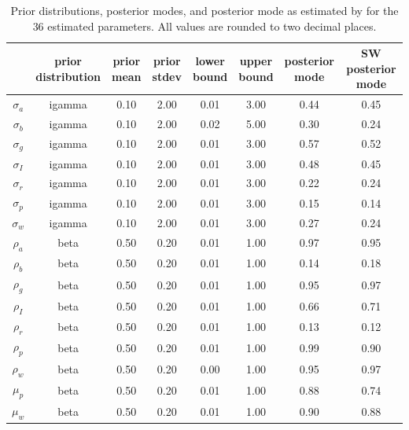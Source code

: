 \documentclass[11pt]{article}
\begin{document}
\begin{table}[t]

\caption{\label{tab:parameter-estimate-table}Prior distributions, posterior modes, and posterior mode as
      estimated by \citep{SmetsWouters2007} for the 36 estimated
      parameters. All values are rounded to two decimal places.}
\centering
\fontsize{9}{11}\selectfont
\begin{tabular}{cccccccc}
\toprule
 & \makecell[c]{prior\\distribution} & \makecell[c]{prior\\mean} & \makecell[c]{prior\\stdev} & \makecell[c]{lower\\bound} & \makecell[c]{upper\\bound} & \makecell[c]{posterior\\mode} & \makecell[c]{SW posterior\\mode}\\
\midrule
$\sigma_a$ & igamma & 0.10 & 2.00 & 0.01 & 3.00 & 0.44 & 0.45\\
$\sigma_b$ & igamma & 0.10 & 2.00 & 0.02 & 5.00 & 0.30 & 0.24\\
$\sigma_g$ & igamma & 0.10 & 2.00 & 0.01 & 3.00 & 0.57 & 0.52\\
$\sigma_I$ & igamma & 0.10 & 2.00 & 0.01 & 3.00 & 0.48 & 0.45\\
$\sigma_r$ & igamma & 0.10 & 2.00 & 0.01 & 3.00 & 0.22 & 0.24\\
\addlinespace
$\sigma_p$ & igamma & 0.10 & 2.00 & 0.01 & 3.00 & 0.15 & 0.14\\
$\sigma_w$ & igamma & 0.10 & 2.00 & 0.01 & 3.00 & 0.27 & 0.24\\
$\rho_a$ & beta & 0.50 & 0.20 & 0.01 & 1.00 & 0.97 & 0.95\\
$\rho_b$ & beta & 0.50 & 0.20 & 0.01 & 1.00 & 0.14 & 0.18\\
$\rho_g$ & beta & 0.50 & 0.20 & 0.01 & 1.00 & 0.95 & 0.97\\
\addlinespace
$\rho_I$ & beta & 0.50 & 0.20 & 0.01 & 1.00 & 0.66 & 0.71\\
$\rho_r$ & beta & 0.50 & 0.20 & 0.01 & 1.00 & 0.13 & 0.12\\
$\rho_p$ & beta & 0.50 & 0.20 & 0.01 & 1.00 & 0.99 & 0.90\\
$\rho_w$ & beta & 0.50 & 0.20 & 0.00 & 1.00 & 0.95 & 0.97\\
$\mu_p$ & beta & 0.50 & 0.20 & 0.01 & 1.00 & 0.88 & 0.74\\
\addlinespace
$\mu_w$ & beta & 0.50 & 0.20 & 0.01 & 1.00 & 0.90 & 0.88\\

\end{tabular}
\end{table}
\end{document}
